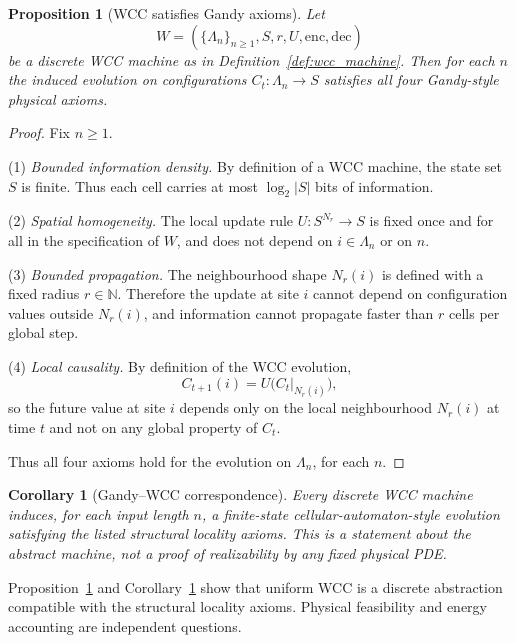 \documentclass[12pt]{article}
\newtheorem{corollary}[theorem]{Corollary}
\newtheorem{proposition}[theorem]{Proposition}
\begin{document}
\begin{proposition}[WCC satisfies Gandy axioms]
\label{prop:gandy-wcc}
Let
\[
W = (\{\Lambda_n\}_{n \ge 1}, S, r, U, \mathrm{enc}, \mathrm{dec})
\]
be a discrete WCC machine as in Definition~\ref{def:wcc_machine}.
Then for each $n$ the induced evolution on configurations
$C_t : \Lambda_n \to S$ satisfies all four Gandy-style physical axioms.
\end{proposition}

\begin{proof}
Fix $n \ge 1$.

(1) \emph{Bounded information density.} By definition of a WCC machine, the
state set $S$ is finite. Thus each cell carries at most $\log_2|S|$ bits of
information.

(2) \emph{Spatial homogeneity.} The local update rule $U : S^{N_r} \to S$
is fixed once and for all in the specification of $W$, and does not depend
on $i \in \Lambda_n$ or on $n$.

(3) \emph{Bounded propagation.} The neighbourhood shape $N_r(i)$ is defined
with a fixed radius $r \in \mathbb{N}$. Therefore the update at site $i$
cannot depend on configuration values outside $N_r(i)$, and information
cannot propagate faster than $r$ cells per global step.

(4) \emph{Local causality.} By definition of the WCC evolution,
\[
C_{t+1}(i) = U\big(C_t|_{N_r(i)}\big),
\]
so the future value at site $i$ depends only on the local neighbourhood
$N_r(i)$ at time $t$ and not on any global property of $C_t$.

Thus all four axioms hold for the evolution on $\Lambda_n$, for each $n$.
\end{proof}

\begin{corollary}[Gandy--WCC correspondence]
\label{cor:gandy-wcc-correspondence}
Every discrete WCC machine induces, for each input length $n$, a
finite-state cellular-automaton-style evolution satisfying the listed
structural locality axioms. This is a statement about the abstract
machine, not a proof of realizability by any fixed physical PDE.
\end{corollary}

Proposition~\ref{prop:gandy-wcc} and
Corollary~\ref{cor:gandy-wcc-correspondence} show that uniform WCC is a discrete abstraction compatible with the
structural locality axioms. Physical feasibility and energy accounting are
independent questions.
\end{document}
